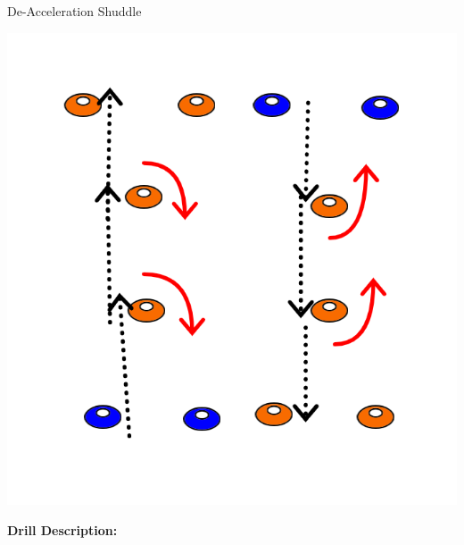 
\begin{oddBlock}{De-Acceleration Shuddle}

\begin{minipage}[t]{\linewidth}
    \centering
    
    \begin{minipage}{.3\linewidth} %
            \includegraphics[width=\textwidth]{../img/Trimmed/deaccel_shuddle}
    \end{minipage}
    \hspace{0.05\linewidth}
    \begin{minipage}{.6\linewidth} %
        \textbf{Drill Description:}

\end{minipage}
\end{minipage}
\end{oddBlock}
